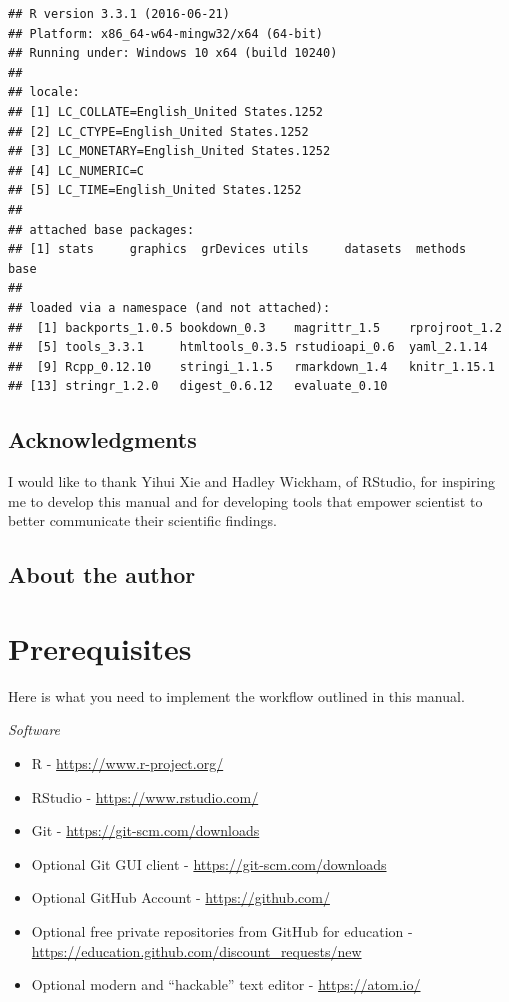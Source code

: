 \documentclass[]{book}
\providecommand{\tightlist}{%
  \setlength{\itemsep}{0pt}\setlength{\parskip}{0pt}}
\begin{document}
\begin{verbatim}
## R version 3.3.1 (2016-06-21)
## Platform: x86_64-w64-mingw32/x64 (64-bit)
## Running under: Windows 10 x64 (build 10240)
## 
## locale:
## [1] LC_COLLATE=English_United States.1252 
## [2] LC_CTYPE=English_United States.1252   
## [3] LC_MONETARY=English_United States.1252
## [4] LC_NUMERIC=C                          
## [5] LC_TIME=English_United States.1252    
## 
## attached base packages:
## [1] stats     graphics  grDevices utils     datasets  methods   base     
## 
## loaded via a namespace (and not attached):
##  [1] backports_1.0.5 bookdown_0.3    magrittr_1.5    rprojroot_1.2  
##  [5] tools_3.3.1     htmltools_0.3.5 rstudioapi_0.6  yaml_2.1.14    
##  [9] Rcpp_0.12.10    stringi_1.1.5   rmarkdown_1.4   knitr_1.15.1   
## [13] stringr_1.2.0   digest_0.6.12   evaluate_0.10
\end{verbatim}

\section{Acknowledgments}\label{acknowledgments}

I would like to thank Yihui Xie and Hadley Wickham, of RStudio, for
inspiring me to develop this manual and for developing tools that
empower scientist to better communicate their scientific findings.

\section{About the author}\label{about-the-author}

\chapter{Prerequisites}\label{prerequisites}

Here is what you need to implement the workflow outlined in this manual.

\emph{Software}

\begin{itemize}
\tightlist
\item
  R - \url{https://www.r-project.org/}
\item
  RStudio - \url{https://www.rstudio.com/}
\item
  Git - \url{https://git-scm.com/downloads}
\item
  Optional Git GUI client - \url{https://git-scm.com/downloads}
\item
  Optional GitHub Account - \url{https://github.com/}
\item
  Optional free private repositories from GitHub for education -
  \url{https://education.github.com/discount_requests/new}
\item
  Optional modern and ``hackable'' text editor - \url{https://atom.io/}
\end{itemize}
\end{document}
